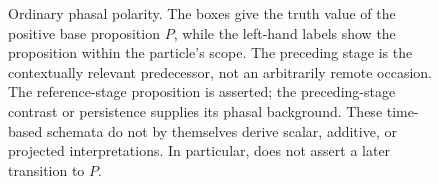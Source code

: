 \begin{figure}[ht]
\centering
{}
\caption{Ordinary phasal polarity. The boxes give the truth value of the
positive base proposition $P$, while the left-hand labels show the proposition
within the particle's scope. The preceding stage is the contextually relevant
predecessor, not an arbitrarily remote occasion. The reference-stage proposition
is asserted; the preceding-stage contrast or persistence supplies its phasal
background. These time-based schemata do not by themselves derive scalar,
additive, or projected interpretations. In particular,  does not
assert a later transition to $P$.}
\label{fig:phasal-polarity}
\end{figure}
